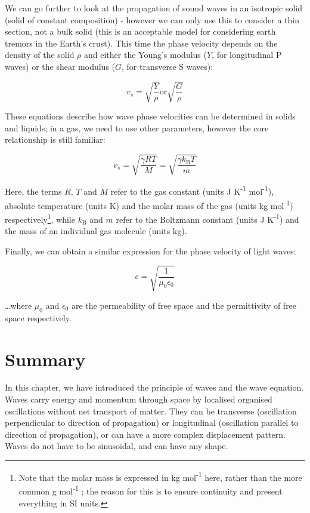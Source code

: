\documentclass[
]{book}
\begin{document}
We can go further to look at the propagation of sound waves in an isotropic solid (solid of constant composition) - however we can only use this to consider a thin section, not a bulk solid (this is an acceptable model for considering earth tremors in the Earth's crust). This time the phase velocity depends on the density of the solid \(\rho\) and either the Young's modulus (\(Y\), for longitudinal P waves) or the shear modulus (\(G\), for transverse S waves):

\begin{equation}
v_s = \sqrt{\frac{Y}{\rho}} \textrm{or} \sqrt{\frac{G}{\rho}}
\end{equation}

These equations describe how wave phase velocities can be determined in solids and liquids; in a gas, we need to use other parameters, however the core relationship is still familiar:

\begin{equation}
v_s = \sqrt{\frac{\gamma RT}{M}} =  \sqrt{\frac{\gamma k_{\mathrm{B}}T}{m}}
\end{equation}

Here, the terms \(R\), \(T\) and \(M\) refer to the gas constant (units J K\textsuperscript{-1} mol\textsuperscript{-1}), absolute temperature (units K) and the molar mass of the gas (units kg mol\textsuperscript{-1}) respectively\footnote{Note that the molar mass is expressed in kg mol\textsuperscript{-1} here, rather than the more common g mol\textsuperscript{-1} ; the reason for this is to ensure continuity and present everything in SI units.}, while \(k_{\textrm{B}}\) and \(m\) refer to the Boltzmann constant (units J K\textsuperscript{-1}) and the mass of an individual gas molecule (units kg).

Finally, we can obtain a similar expression for the phase velocity of light waves:

\begin{equation}
c = \sqrt{\frac{1}{\mu_0 \epsilon_0}}
\end{equation}

\ldots where \(\mu_0\) and \(\epsilon_0\) are the permeability of free space and the permittivity of free space respectively.

\hypertarget{sec-ch6-summary}{%
\section{Summary}\label{sec-ch6-summary}}

In this chapter, we have introduced the principle of waves and the wave equation. Waves carry energy and momentum through space by localised organised oscillations without net transport of matter. They can be transverse (oscillation perpendicular to direction of propagation) or longitudinal (oscillation parallel to direction of propagation), or can have a more complex displacement pattern. Waves do not have to be sinusoidal, and can have any shape.
\end{document}
